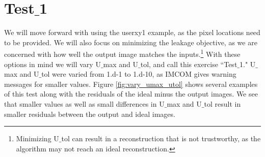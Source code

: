 \documentclass[12pt,preprint]{aastex6}
\begin{document}
\section{Test${\_}$1}
We will move forward with using the userxy1 example, as the pixel locations need to be provided. We will also focus on minimizing the leakage objective, as we are concerned with how well the output image matches the inputs.\footnote{Minimizing U${\_}$tol can result in a reconstruction that is not trustworthy, as the algorithm may not reach an ideal reconstruction.} With these options in mind we will vary U${\_}$max and U${\_}$tol, and call this exercise ``Test${\_}$1." U${\_}$max and U${\_}$tol were varied from 1.d-1 to 1.d-10, as IMCOM gives warning messages for smaller values. Figure \ref{fig:vary_umax_utol} shows several examples of this test along with the residuals of the ideal minus the output images. We see that smaller values as well as small differences in U${\_}$max and U${\_}$tol result in smaller residuals between the output and ideal images. 
\end{document}
